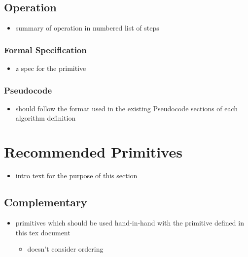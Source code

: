 \documentclass[../../main.tex]{subfiles}
\begin{document}
\subsection{Operation}

\begin{itemize}

\item summary of operation in numbered list of steps

\end{itemize}

\subsubsection{Formal Specification}


\begin{itemize}

\item z spec for the primitive

\end{itemize}

\subsubsection{Pseudocode}

\begin{itemize}

\item should follow the format used in the existing Pseudocode sections of each algorithm definition

\end{itemize}

\section{Recommended Primitives}

\begin{itemize}

\item intro text for the purpose of this section

\end{itemize}

\subsection{Complementary}

\begin{itemize}

\item primitives which should be used hand-in-hand with the primitive defined in this tex document

  \begin{itemize}
  \item doesn't consider ordering
  \end{itemize}

\end{itemize}
\end{document}
